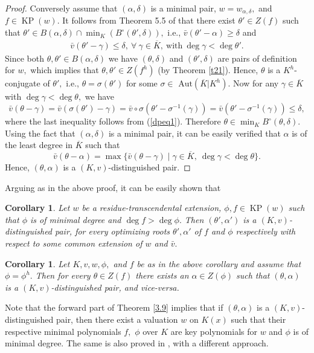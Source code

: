 \documentclass[11pt]{amsart}
\newtheorem{corollary}[theorem]{Corollary}
\theoremstyle{definition}
\theoremstyle{remark}
\numberwithin{equation}{section}
\begin{document}
\begin{proof}
	Conversely assume that $(\alpha,\delta)$ is a minimal pair, $w=w_{\alpha,\delta},$  and $f\in \operatorname{KP}(w).$ It follows from Theorem 5.5 of \cite{EJP} that there exist $\theta'\in Z(f)$ such that $\theta'\in B(\alpha,\delta) \cap\min_K(B^\circ(\theta',\delta)),$ i.e., $\bar{v}(\theta'-\alpha)\geq \delta$ and 
	\begin{align}\label{dpeq1}
		\bar{v}(\theta'-\gamma)\leq \delta, \ \forall \ \gamma\in\overline{K}, \ \text{with} \ \deg \gamma <\deg\theta'.\end{align}
	Since both $\theta,\theta'\in B(\alpha,\delta)$ we have $(\theta,\delta)$ and $(\theta',\delta)$ are pairs of definition for $w,$ which implies that $\theta,\theta'\in Z(f^h)$ (by Theorem \ref{t21}). Hence, $\theta$ is a $K^h$-conjugate of $\theta',$ i.e., $\theta = \sigma(\theta')$ for some $\sigma\in\text{ Aut}(\overline{K}|K^h).$ Now for any $\gamma\in \overline{K}$ with $\deg \gamma<\deg\theta,$ we have
	\[\bar{v}(\theta-\gamma)=\bar{v}(\sigma(\theta')-\gamma)=\bar{v}\circ\sigma(\theta'-\sigma^{-1}(\gamma))=\bar{v}(\theta'-\sigma^{-1}(\gamma))\leq \delta,\] where the last inequality follows from (\ref{dpeq1}). Therefore $\theta \in \min_KB^\circ(\theta,\delta)$. Using the fact that $(\alpha,\delta)$ is a minimal pair, it can be easily verified that $\alpha$ is of the least degree in $\overline{K}$ such that
	\[\bar{v}(\theta-\alpha)=\max\{\bar{v}(\theta-\gamma)\mid \gamma \in \overline{K}, \ \deg \gamma < \deg \theta\}.\] Hence, $(\theta,\alpha)$ is a $(K,v)$-distinguished pair.
	\end{proof}

Arguing as in the above proof, it can be easily shown that 
\begin{corollary}
	Let $w$ be a residue-transcendental extension, $\phi, f\in \operatorname{KP}(w)$ such that $\phi$ is of minimal degree and $\deg f>\deg \phi.$ Then  $(\theta',\alpha')$ is a $(K,v)$-distinguished pair, for every optimizing roots  $\theta',\alpha'$ of $f$ and $\phi$ respectively with respect to some common extension of $w$ and $\bar{v}.$
	\end{corollary}
	\begin{corollary}
		 	Let $K, v, w, \phi,$ and $f$ be as in the above corollary and assume that $\phi=\phi^h.$ Then for every $\theta \in Z(f)$ there exists an $\alpha \in Z(\phi)$ such that $(\theta,\alpha)$ is a
		$(K,v)$-distinguished pair, and vice-versa.
	\end{corollary}
	
	Note that the forward part of Theorem \ref{3.9} implies that if $(\theta,\alpha)$ is a $(K,v)$-distinguished pair, then there exist a valuation $w$ on $K(x)$  such that their respective minimal polynomials $f,$ $\phi$ over $K$ are key polynomials for $w$ and $\phi$ is of minimal degree. The same is also proved in \cite[Lemma 3.1]{AR}, with a different approach.
	
\end{document}
